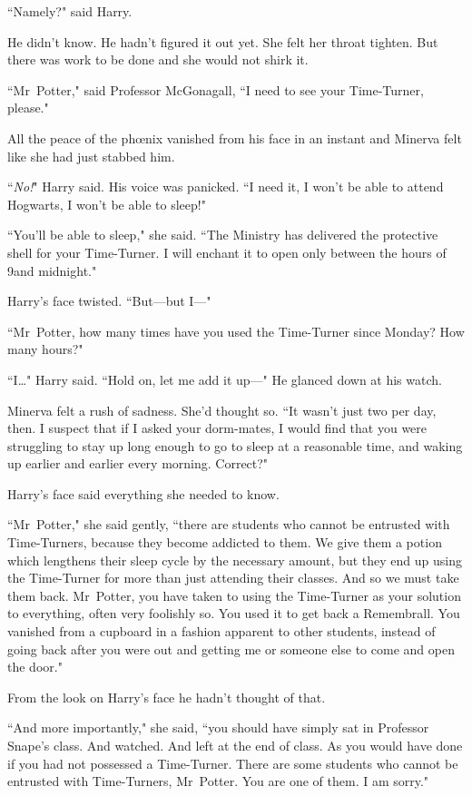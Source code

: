 ``Namely?" said Harry.

He didn't know. He hadn't figured it out yet. She felt her throat tighten. But there was work to be done and she would not shirk it.

``Mr~Potter," said Professor McGonagall, ``I need to see your Time-Turner, please."

All the peace of the phœnix vanished from his face in an instant and Minerva felt like she had just stabbed him.

``\emph{No!}" Harry said. His voice was panicked. ``I need it, I won't be able to attend Hogwarts, I won't be able to sleep!"

``You'll be able to sleep," she said. ``The Ministry has delivered the protective shell for your Time-Turner. I will enchant it to open only between the hours of 9\pm and midnight."

Harry's face twisted. ``But—but I—"

``Mr~Potter, how many times have you used the Time-Turner since Monday? How many hours?"

``I…" Harry said. ``Hold on, let me add it up—" He glanced down at his watch.

Minerva felt a rush of sadness. She'd thought so. ``It wasn't just two per day, then. I suspect that if I asked your dorm-mates, I would find that you were struggling to stay up long enough to go to sleep at a reasonable time, and waking up earlier and earlier every morning. Correct?"

Harry's face said everything she needed to know.

``Mr~Potter," she said gently, ``there are students who cannot be entrusted with Time-Turners, because they become addicted to them. We give them a potion which lengthens their sleep cycle by the necessary amount, but they end up using the Time-Turner for more than just attending their classes. And so we must take them back. Mr~Potter, you have taken to using the Time-Turner as your solution to everything, often very foolishly so. You used it to get back a Remembrall. You vanished from a cupboard in a fashion apparent to other students, instead of going back after you were out and getting me or someone else to come and open the door."

From the look on Harry's face he hadn't thought of that.

``And more importantly," she said, ``you should have simply sat in Professor Snape's class. And watched. And left at the end of class. As you would have done if you had not possessed a Time-Turner. There are some students who cannot be entrusted with Time-Turners, Mr~Potter. You are one of them. I am sorry."

